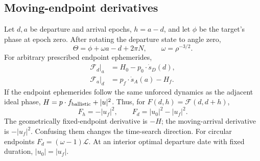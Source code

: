 \subsection{Moving-endpoint derivatives}
Let $d,a$ be departure and arrival epochs, $h=a-d$, and let $\phi$
be the target's phase at epoch zero. After rotating the departure
state to angle zero,
\begin{equation}
 \Theta=\phi+\omega a-d+2\pi N,\qquad
 \omega=\rho^{-3/2}.
\end{equation}
For arbitrary prescribed endpoint ephemerides,
\begin{equation}
 \begin{split}
 \mathcal F_d\big|_a&=H_0-p_0\cdot\dot s_D(d),\\
 \mathcal F_a\big|_d&=p_f\cdot\dot s_A(a)-H_f.
 \end{split}
 \label{eq:generaldate}
\end{equation}
If the endpoint ephemerides follow the same unforced dynamics as the
adjacent ideal phase, $H=p\cdot f_{\rm ballistic}+|u|^2$.
Thus, for $F(d,h)=\mathcal F(d,d+h)$,
\begin{equation}
 \boxed{F_h=-|u_f|^2,\qquad F_d=|u_0|^2-|u_f|^2.}
 \label{eq:dates}
\end{equation}
The geometrically fixed-endpoint derivative is $-H$; the moving-arrival
derivative is $-|u_f|^2$. Confusing them changes the time-search direction.
For circular endpoints $F_d=(\omega-1)\mathcal L$.
At an interior optimal departure date with fixed duration,
$|u_0|=|u_f|$.

